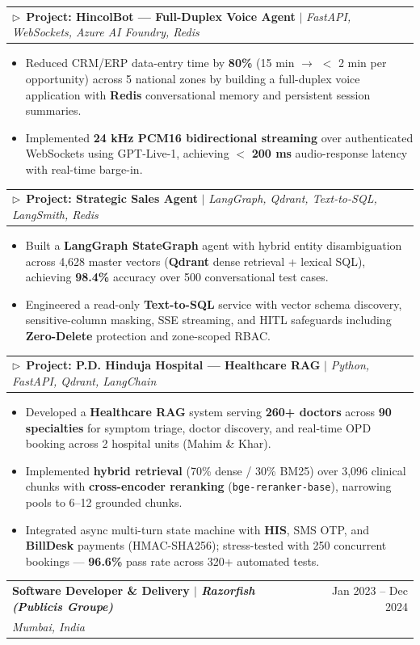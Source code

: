 \documentclass[a4paper,11pt]{article}
\makeatletter
\newcommand{\resumeItem}[1]{
  \item\small{
    {#1 \vspace{-2pt}}
  }
}
\newcommand{\resumeSubheading}[4]{
  \vspace{-2pt}\item
    \begin{tabular*}{0.97\textwidth}[t]{l@{\extracolsep{\fill}}r}
      \textbf{#1} & #2 \\
      \textit{\small#3} & \textit{\small #4} \\
    \end{tabular*}\vspace{-6pt}
}
\newcommand{\resumeProjectHeading}[2]{
    \item\hspace{6pt}
    \begin{tabular*}{0.95\textwidth}{l@{\extracolsep{\fill}}r}
      \small#1 & #2 \\
    \end{tabular*}\vspace{-6pt}
}
\newcommand{\resumeItemListStart}{\begin{itemize}}
\newcommand{\resumeItemListEnd}{\end{itemize}\vspace{-5pt}}
\makeatother
\begin{document}
      \resumeProjectHeading
          {$\triangleright$\ \textbf{Project: HincolBot --- Full-Duplex Voice Agent} $|$ \emph{FastAPI, WebSockets, Azure AI Foundry, Redis}}{}
      \resumeItemListStart
        \resumeItem{Reduced CRM/ERP data-entry time by \textbf{80\%} (15 min $\to$ $<$ 2 min per opportunity) across 5 national zones by building a full-duplex voice application with \textbf{Redis} conversational memory and persistent session summaries.}
        \resumeItem{Implemented \textbf{24 kHz PCM16 bidirectional streaming} over authenticated WebSockets using GPT-Live-1, achieving $<$ \textbf{200 ms} audio-response latency with real-time barge-in.}
      \resumeItemListEnd

      \resumeProjectHeading
          {$\triangleright$\ \textbf{Project: Strategic Sales Agent} $|$ \emph{LangGraph, Qdrant, Text-to-SQL, LangSmith, Redis}}{}
      \resumeItemListStart
        \resumeItem{Built a \textbf{LangGraph StateGraph} agent with hybrid entity disambiguation across 4,628 master vectors (\textbf{Qdrant} dense retrieval + lexical SQL), achieving \textbf{98.4\%} accuracy over 500 conversational test cases.}
        \resumeItem{Engineered a read-only \textbf{Text-to-SQL} service with vector schema discovery, sensitive-column masking, SSE streaming, and HITL safeguards including \textbf{Zero-Delete} protection and zone-scoped RBAC.}
      \resumeItemListEnd

      \resumeProjectHeading
          {$\triangleright$\ \textbf{Project: P.D. Hinduja Hospital --- Healthcare RAG} $|$ \emph{Python, FastAPI, Qdrant, LangChain}}{}
      \resumeItemListStart
        \resumeItem{Developed a \textbf{Healthcare RAG} system serving \textbf{260+ doctors} across \textbf{90 specialties} for symptom triage, doctor discovery, and real-time OPD booking across 2 hospital units (Mahim \& Khar).}
        \resumeItem{Implemented \textbf{hybrid retrieval} (70\% dense / 30\% BM25) over 3,096 clinical chunks with \textbf{cross-encoder reranking} (\texttt{bge-reranker-base}), narrowing pools to 6--12 grounded chunks.}
        \resumeItem{Integrated async multi-turn state machine with \textbf{HIS}, SMS OTP, and \textbf{BillDesk} payments (HMAC-SHA256); stress-tested with 250 concurrent bookings --- \textbf{96.6\%} pass rate across 320+ automated tests.}
      \resumeItemListEnd

    \vspace{3pt}
    \resumeSubheading
      {Software Developer \& Delivery $|$ \textit{\textnormal{Razorfish (Publicis Groupe)}}}{Jan 2023 -- Dec 2024}
      {Mumbai, India}{}
\end{document}
